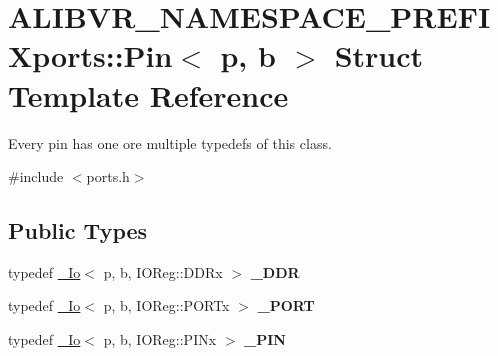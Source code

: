 \hypertarget{structALIBVR__NAMESPACE__PREFIXports_1_1Pin}{}\section{A\+L\+I\+B\+V\+R\+\_\+\+N\+A\+M\+E\+S\+P\+A\+C\+E\+\_\+\+P\+R\+E\+F\+I\+Xports\+:\+:Pin$<$ p, b $>$ Struct Template Reference}
\label{structALIBVR__NAMESPACE__PREFIXports_1_1Pin}


Every pin has one ore multiple typedefs of this class.  




{\ttfamily \#include $<$ports.\+h$>$}

\subsection*{Public Types}
\begin{DoxyCompactItemize}
\item 
typedef \hyperlink{structALIBVR__NAMESPACE__PREFIXports_1_1__Io}{\+\_\+\+Io}$<$ p, b, I\+O\+Reg\+::\+D\+D\+Rx $>$ {\bfseries \+\_\+\+D\+DR}\hypertarget{structALIBVR__NAMESPACE__PREFIXports_1_1Pin_a818a1f1bb31f68679f39c93c3f9b8d45}{}\label{structALIBVR__NAMESPACE__PREFIXports_1_1Pin_a818a1f1bb31f68679f39c93c3f9b8d45}

\item 
typedef \hyperlink{structALIBVR__NAMESPACE__PREFIXports_1_1__Io}{\+\_\+\+Io}$<$ p, b, I\+O\+Reg\+::\+P\+O\+R\+Tx $>$ {\bfseries \+\_\+\+P\+O\+RT}\hypertarget{structALIBVR__NAMESPACE__PREFIXports_1_1Pin_a4252742825731efb06d4928c0ddfd8fe}{}\label{structALIBVR__NAMESPACE__PREFIXports_1_1Pin_a4252742825731efb06d4928c0ddfd8fe}

\item 
typedef \hyperlink{structALIBVR__NAMESPACE__PREFIXports_1_1__Io}{\+\_\+\+Io}$<$ p, b, I\+O\+Reg\+::\+P\+I\+Nx $>$ {\bfseries \+\_\+\+P\+IN}\hypertarget{structALIBVR__NAMESPACE__PREFIXports_1_1Pin_aa77ff77d7b1bd7f127a907c04d13c36a}{}\label{structALIBVR__NAMESPACE__PREFIXports_1_1Pin_aa77ff77d7b1bd7f127a907c04d13c36a}

\end{DoxyCompactItemize}
